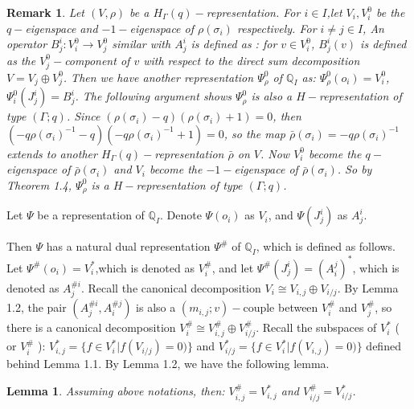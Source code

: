 \def\CTEXPreproc{Created by ctex v0.2.12, don't edit!}\documentclass[11pt]{article}
\newtheorem{lem}{Lemma}[section]
\newtheorem{rem}{Remark}[section]
\begin{document}
\begin{rem}
Let $ (V,\rho )$ be a $H_{\Gamma}(q)-$representation. For $i\in I$,let $V_i ,V^0 _i$ be the $q-$eigenspace and $-1-$eigenspace of $\rho(\sigma_i )$ respectively. For $i\neq j\in I$, An operator $B^i _j : V^0 _i \rightarrow V^0 _j$ similar with $A^i _j$ is defined
as : for $v\in V^0 _i$, $B^i _j (v)$ is defined as the $V^0 _j -$component of $v$ with respect to the direct sum decomposition
$V= V_j \oplus V^0 _j$. Then we have another representation $\Psi^0 _{\rho}$ of $\mathbb{Q}_I$ as: $\Psi^0 _{\rho}(o_i)=V^0 _i$,
$\Psi^0 _i (J^i _j)= B^i _j$. The following argument shows $\Psi^0 _{\rho}$ is also a $H-$representation of type $(\Gamma;q)$. Since
$ ( \rho(\sigma_i) -q  )( \rho(\sigma_i) +1 )=0$, then $ ( -q \rho(\sigma_i)^{-1} -q   )( -q \rho (\sigma_i )^{-1}+1   )=0 $, so the map
 $\bar{\rho}( \sigma_i )=-q \rho(\sigma_i)^{-1} $ extends to another $H_{\Gamma}(q)-$representation $\bar{\rho}$ on $V$. Now $V^0 _i$ become the $q-$eigenspace of $\bar{\rho}(\sigma_i)$ and $V_i$ become the $-1-$eigenspace of $\bar{\rho}(\sigma_i)$. So by Theorem 1.4,
 $\Psi^0 _{\rho}$ is a $H-$representation of type $(\Gamma ;q)$.
 \end{rem}


   Let $\Psi$ be a representation of $\mathbb{Q}_I $. Denote $\Psi (o_i )$ as $V_i $, and $\Psi ( J^i _j )$ as $A^i _j$.

   Then $\Psi$ has a natural dual representation $\Psi^{\#  }$ of $\mathbb{Q}_I$,
   which is defined as follows.  Let $\Psi^{\# } (o_i ) = V^{*} _i  $,which is denoted as $V^{\#}_i$,  and let $\Psi^{\#}(J^i _j ) = ( A^j _i  )^{*} $, which is denoted as $A^{\# i}_{j} $. Recall the canonical decomposition $V_i \cong V_{i,j}\oplus V_{i/j}$. By Lemma 1.2, the pair
   $( A^{\# i}_j , A^{\# j}_i  )$ is also a $( m_{i,j};v )-$couple between $V^{\#} _i$ and $ V^{\# }_j $, so there is a canonical decomposition
    $V^{\#}_i \cong V^{\#}_{i,j}\oplus V^{\#}_{i/j}  $. Recall the subspaces of $V^* _i$ ( or $V^{\#} _i $ ): $V^* _{i,j} =\{ f \in V^* _i | f(  V_{i/j} )=0 ) \} $ and
     $V^* _{i/j}= \{ f \in V^* _i | f(  V_{i,j} )=0 ) \}$ defined behind Lemma 1.1.  By Lemma 1.2, we have the following lemma.

      \begin{lem} Assuming above notations, then:  $V^{\#}_{i,j}= V^* _{i,j}$ and  $V^{\#}_{i/j} = V^*_{i/j} $.

  \end{lem}
\end{document}
